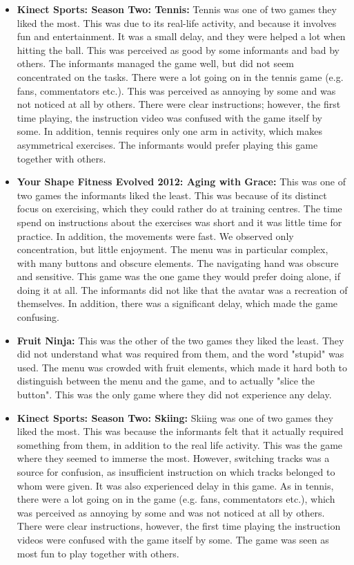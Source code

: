 \begin{itemize}
\item \textbf{Kinect Sports: Season Two: Tennis:} Tennis was one of two games they liked the most. This was due to its real-life activity, and because it involves fun and entertainment. It was a small delay, and they were helped a lot when hitting the ball. This was perceived as good by some informants and bad by others. The informants managed the game well, but did not seem concentrated on the tasks. There were a lot going on in the tennis game (e.g. fans, commentators etc.). This was perceived as annoying by some and was not noticed at all by others. There were clear instructions; however, the first time playing, the instruction video was confused with the game itself by some. In addition, tennis requires only one arm in activity, which makes asymmetrical exercises. The informants would prefer playing this game together with others. 

\item \textbf{Your Shape Fitness Evolved 2012: Aging with Grace:} This was one of two games the informants liked the least. This was because of its distinct focus on exercising, which they could rather do at training centres.  The time spend on instructions about the exercises was short and it was little time for practice. In addition, the movements were fast.  We observed only concentration, but little enjoyment. The menu was in particular complex, with many buttons and obscure elements. The navigating hand was obscure and sensitive. This game was the one game they would prefer doing alone, if doing it at all. The informants did not like that the avatar was a recreation of themselves. In addition, there was a significant delay, which made the game confusing.

\item \textbf{Fruit Ninja:} This was the other of the two games they liked the least.  They did not understand what was required from them, and the word "stupid" was used. The menu was crowded with fruit elements, which made it hard both to distinguish between the menu and the game, and to actually "slice the button". This was the only game where they did not experience any delay.

\item \textbf{Kinect Sports: Season Two: Skiing:} Skiing was one of two games they liked the most. This was because the informants felt that it actually required something from them, in addition to the real life activity. This was the game where they seemed to immerse the most. However, switching tracks was a source for confusion, as insufficient instruction on which tracks belonged to whom were given. It was also experienced delay in this game. As in tennis, there were a lot going on in the game (e.g. fans, commentators etc.), which was perceived as annoying by some and was not noticed at all by others. There were clear instructions, however, the first time playing the instruction videos were confused with the game itself by some. The game was seen as most fun to play together with others. 
\end{itemize}

